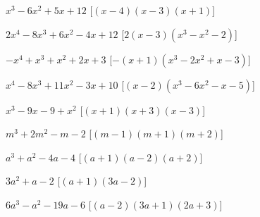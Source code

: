 \begin{esercizio}
\begin{enumeratea}
\item \(x^{3} - 6 x^{2} + 5 x + 12\)
  \hfill [\(\left(x - 4\right) \left(x - 3\right) \left(x + 1\right)\)]
\item \(2 x^{4} - 8 x^{3} + 6 x^{2} - 4 x + 12\)
  \hfill [\(2 \left(x - 3\right) \left(x^{3} - x^{2} - 2\right)\)]
\item \(- x^{4} + x^{3} + x^{2} + 2 x + 3\)
  \hfill [\(- \left(x + 1\right) \left(x^{3} - 2 x^{2} + x - 3\right)\)]
\item \(x^{4} - 8 x^{3} + 11 x^{2} - 3 x + 10\)
  \hfill [\(\left(x - 2\right) \left(x^{3} - 6 x^{2} - x - 5\right)\)]
% 
 \item $x^{3}-9x-9+x^{2}$
  \hfill [$(x+1)(x+3)\left(x-3\right)$]
\item $m^{3}+2m^{2}-m-2$
  \hfill [$(m-1)(m+1)\left(m+2\right)$]
\item $a^{3}+a^{2}-4a-4$
  \hfill [$(a+1)(a-2)\left(a+2\right)$]
\item $3a^{2}+a-2$
  \hfill [$(a+1)\left(3a-2\right)$]
\item $6a^{3}-a^{2}-19a-6$
  \hfill [$(a-2)(3a+1)\left(2a+3\right)$]
 \end{enumeratea}
\end{esercizio}

